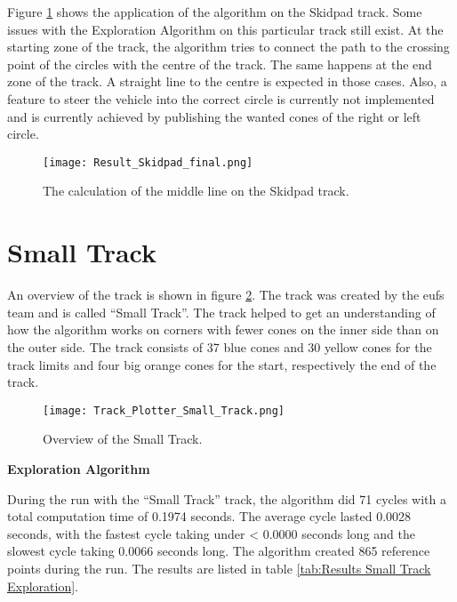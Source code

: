 Figure \ref{fig:Result Skidpad Final} shows the application of the algorithm on the Skidpad track. Some issues with the Exploration Algorithm on this particular track still exist. At the starting zone of the track, the algorithm tries to connect the path to the crossing point of the circles with the centre of the track. The same happens at the end zone of the track. A straight line to the centre is expected in those cases. Also, a feature to steer the vehicle into the correct circle is currently not implemented and is currently achieved by publishing the wanted cones of the right or left circle.
\begin{figure}[H]
    \centering
    \texttt{[image: Result\_Skidpad\_final.png]}
    \caption{The calculation of the middle line on the Skidpad track.}
    \label{fig:Result Skidpad Final}
\end{figure}

\section{Small Track} \label{sec:Results Small Track}
An overview of the track is shown in figure \ref{fig:Results Small Track Initial}. The track was created by the \acrshort{eufs} team and is called ``Small Track''. \cite{eufs_sim_gitlab} The track helped to get an understanding of how the algorithm works on corners with fewer cones on the inner side than on the outer side. The track consists of 37 blue cones and 30 yellow cones for the track limits and four big orange cones for the start, respectively the end of the track.
\begin{figure}[H]
    \centering
    \texttt{[image: Track\_Plotter\_Small\_Track.png]}
    \caption{Overview of the Small Track.}
    \label{fig:Results Small Track Initial}
\end{figure}

\textbf{Exploration Algorithm}

During the run with the ``Small Track'' track, the algorithm did 71 cycles with a total computation time of 0.1974 seconds. The average cycle lasted 0.0028 seconds, with the fastest cycle taking under < 0.0000 seconds long and the slowest cycle taking 0.0066 seconds long. The algorithm created 865 reference points during the run. The results are listed in table \ref{tab:Results Small Track Exploration}.

